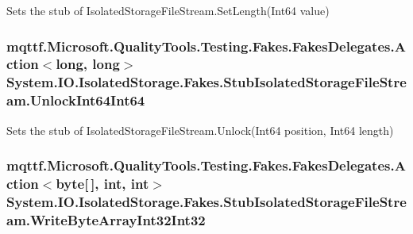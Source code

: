 Sets the stub of Isolated\-Storage\-File\-Stream.\-Set\-Length(\-Int64 value)

\hypertarget{class_system_1_1_i_o_1_1_isolated_storage_1_1_fakes_1_1_stub_isolated_storage_file_stream_ac602d147d24ccbfc6de20df71faba068}{
\subsubsection[{Unlock\-Int64\-Int64}]{\setlength{\rightskip}{0pt plus 5cm}mqttf.\-Microsoft.\-Quality\-Tools.\-Testing.\-Fakes.\-Fakes\-Delegates.\-Action$<$long, long$>$ System.\-I\-O.\-Isolated\-Storage.\-Fakes.\-Stub\-Isolated\-Storage\-File\-Stream.\-Unlock\-Int64\-Int64}}\label{class_system_1_1_i_o_1_1_isolated_storage_1_1_fakes_1_1_stub_isolated_storage_file_stream_ac602d147d24ccbfc6de20df71faba068}


Sets the stub of Isolated\-Storage\-File\-Stream.\-Unlock(\-Int64 position, Int64 length)

\hypertarget{class_system_1_1_i_o_1_1_isolated_storage_1_1_fakes_1_1_stub_isolated_storage_file_stream_a1ab0e33e6720f2a19d43e0ed519638f2}{
\subsubsection[{Write\-Byte\-Array\-Int32\-Int32}]{\setlength{\rightskip}{0pt plus 5cm}mqttf.\-Microsoft.\-Quality\-Tools.\-Testing.\-Fakes.\-Fakes\-Delegates.\-Action$<$byte\mbox{[}$\,$\mbox{]}, int, int$>$ System.\-I\-O.\-Isolated\-Storage.\-Fakes.\-Stub\-Isolated\-Storage\-File\-Stream.\-Write\-Byte\-Array\-Int32\-Int32}}\label{class_system_1_1_i_o_1_1_isolated_storage_1_1_fakes_1_1_stub_isolated_storage_file_stream_a1ab0e33e6720f2a19d43e0ed519638f2}


